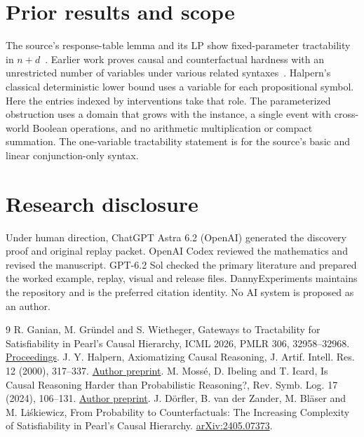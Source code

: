 \documentclass[11pt]{amsart}
\begin{document}
\section{Prior results and scope}
The source's response-table lemma and its LP show fixed-parameter tractability in \(n+d\)~\cite[Theorem~5.3]{GGW}. Earlier work proves causal and counterfactual hardness with an unrestricted number of variables under various related syntaxes~\cite{H,MII,D}. Halpern's classical deterministic lower bound uses a variable for each propositional symbol. Here the entries indexed by interventions take that role. The parameterized obstruction uses a domain that grows with the instance, a single event with cross-world Boolean operations, and no arithmetic multiplication or compact summation. The one-variable tractability statement is for the source's basic and linear conjunction-only syntax.

\section*{Research disclosure}
Under human direction, ChatGPT Astra 6.2 (OpenAI) generated the discovery proof and original replay packet. OpenAI Codex reviewed the mathematics and revised the manuscript. GPT-6.2 Sol checked the primary literature and prepared the worked example, replay, visual and release files. DannyExperiments maintains the repository and is the preferred citation identity. No AI system is proposed as an author.

\begin{thebibliography}{9}
 R. Ganian, M. Gr\"undel and S. Wietheger, Gateways to Tractability for Satisfiability in Pearl's Causal Hierarchy, ICML 2026, PMLR 306, 32958--32968. \href{https://proceedings.mlr.press/v306/ganian26a.html}{Proceedings}.
 J. Y. Halpern, Axiomatizing Causal Reasoning, J. Artif. Intell. Res. 12 (2000), 317--337. \href{https://arxiv.org/abs/cs/0005030}{Author preprint}.
 M. Moss\'e, D. Ibeling and T. Icard, Is Causal Reasoning Harder than Probabilistic Reasoning?, Rev. Symb. Log. 17 (2024), 106--131. \href{https://arxiv.org/abs/2111.13936}{Author preprint}.
 J. D\"orfler, B. van der Zander, M. Bl\"aser and M. Li\'skiewicz, From Probability to Counterfactuals: The Increasing Complexity of Satisfiability in Pearl's Causal Hierarchy. \href{https://arxiv.org/abs/2405.07373}{arXiv:2405.07373}.
\end{thebibliography}
\end{document}
